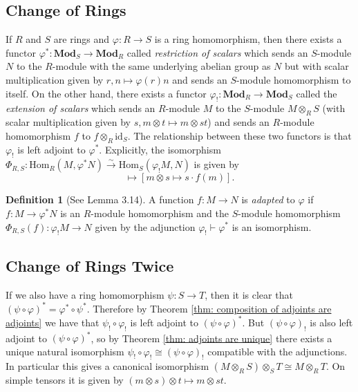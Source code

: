 \documentclass[oneside,11pt]{amsart}
\newcommand{\bMod}{\ensuremath{\textbf{Mod}}}
\newcommand{\Hom}{\ensuremath{\text{Hom}}}
\newcommand{\id}{\ensuremath{\text{id}}}
\theoremstyle{definition}
\newtheorem{definition}{Definition}
\newtheorem{proof techniques}{Proof Techniques}
\begin{document}

\subsection{Change of Rings}

If $R$ and $S$ are rings and $\varphi: R \to S$ is a ring homomorphism, then there exists a functor $\varphi^* : \bMod_S \rightarrow \bMod_R$ called \emph{restriction of scalars} which sends an $S$-module $N$ to the $R$-module with the same underlying abelian group as $N$ but with scalar multiplication given by $r , n \mapsto \varphi(r) n$ and sends an $S$-module homomorphism to itself. On the other hand, there exists a functor $\varphi_! : \bMod_R \to \bMod_S$ called the \emph{extension of scalars} which sends an $R$-module $M$ to the $S$-module $M \otimes_R S$ (with scalar multiplication given by $s, m \otimes t \mapsto m \otimes st$) and sends an $R$-module homomorphism $f$ to $f \otimes_R \id_S$. The relationship between these two functors is that $\varphi_!$ is left adjoint to $\varphi^*$. Explicitly, the isomorphism $\Phi_{R , S} : \Hom_{R}(M , \varphi^* N) \overset{\sim}{\to}  \Hom_{S}(\varphi_! M , N)$ is given by 
\begin{equation*}
[f : M \to \varphi^* N ]   \mapsto [ m \otimes s \mapsto s \cdot f(m) ].
\end{equation*} 

\begin{definition}[See \cite{demazure-gabriel1980} Lemma 3.14]\label{def: adapted function}
A function $f: M \to N$ is \emph{adapted} to $\varphi$ if $f : M \to \varphi^* N$ is an $R$-module homomorphism and the $S$-module homomorphism $\Phi_{R , S}(f) : \varphi_! M \to N$ given by the adjunction $\varphi_! \vdash \varphi^*$ is an isomorphism.
\end{definition}


\subsection{Change of Rings Twice}

If we also have a ring homomorphism $\psi : S \to T$, then it is clear that $(\psi \circ \varphi)^* = \varphi^* \circ \psi^*$. Therefore by Theorem \ref{thm: composition of adjoints are adjoints} we have that $\psi_! \circ \varphi_!$ is left adjoint to $(\psi \circ \varphi)^*$. But $(\psi \circ \varphi)_!$ is also left adjoint to $(\psi \circ \varphi)^*$, so by Theorem \ref{thm: adjoints are unique} there exists a unique natural isomorphism  $\psi_! \circ \varphi_! \cong (\psi \circ \varphi)_!$ compatible with the adjunctions. In particular this gives a canonical isomorphism $(M \otimes_R S) \otimes_S T \cong M \otimes_R T$. On simple tensors it is given by $(m \otimes s) \otimes t \mapsto m \otimes st$.
\end{document}
